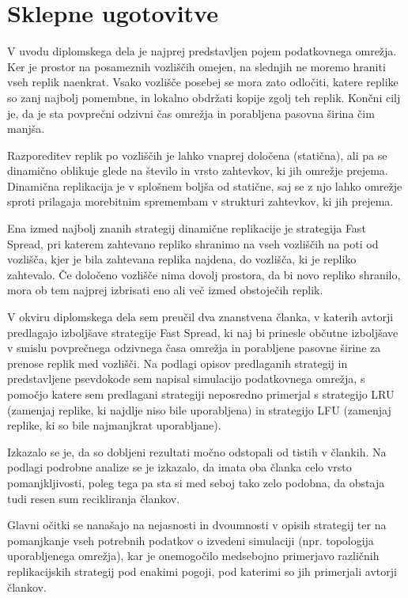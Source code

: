 \documentclass[a4paper, 12pt]{book}
\begin{document}
\chapter{Sklepne ugotovitve}

V uvodu diplomskega dela je najprej predstavljen pojem podatkovnega omre\-žja.
Ker je prostor na posameznih vozliščih omejen, na slednjih ne moremo hraniti
vseh replik naenkrat. Vsako vozlišče posebej se mora zato odločiti, katere
replike so zanj najbolj pomembne, in lokalno obdržati kopije zgolj teh replik.
Končni cilj je, da je sta povprečni odzivni čas omrežja in porabljena pasovna
širina čim manjša.

Razporeditev replik po vozliščih je lahko vnaprej določena (statična), ali
pa se dinamično oblikuje glede na število in vrsto zahtevkov, ki jih omrežje
prejema. Dinamična replikacija je v splošnem boljša od statične, saj se
z njo lahko omrežje sproti prilagaja morebitnim spremembam v strukturi
zahtevkov, ki jih prejema.

Ena izmed najbolj znanih strategij dinamične replikacije je strategija
Fast Spread, pri katerem zahtevano repliko shranimo na vseh vozliščih na
poti od vozlišča, kjer je bila zahtevana replika najdena, do vozlišča, ki
je repliko zahtevalo. Če določeno vozlišče nima dovolj prostora, da
bi novo repliko shranilo, mora ob tem najprej izbrisati eno ali več
izmed obstoječih replik.

V okviru diplomskega dela sem preučil dva znanstvena članka, v katerih avtorji
predlagajo izboljšave strategije Fast Spread, ki naj bi prinesle občutne
izboljšave v smislu povprečnega odzivnega časa omrežja in porabljene
pasovne širine za prenose replik med vozlišči. Na podlagi opisov predlaganih
strategij in predstavljene psevdokode sem napisal simulacijo podatkovnega
omrežja, s pomočjo katere sem predlagani strategiji neposredno primerjal s
strategijo LRU (zamenjaj replike, ki najdlje niso bile uporabljena) in
strategijo LFU (zamenjaj replike, ki so bile najmanjkrat uporabljane).

Izkazalo se je, da so dobljeni rezultati močno odstopali od tistih v člankih.
Na podlagi podrobne analize se je izkazalo, da imata oba članka celo vrsto
pomanjkljivosti, poleg tega pa sta si med seboj tako zelo podobna, da
obstaja tudi resen sum recikliranja člankov.

Glavni očitki se nanašajo na nejasnosti in dvoumnosti v opisih strategij
ter na pomanjkanje vseh potrebnih podatkov o izvedeni simulaciji (npr.
topologija uporabljenega omrežja), kar je onemogočilo medsebojno primerjavo
različnih replikacijskih strategij pod enakimi pogoji, pod katerimi so jih
primerjali avtorji člankov.
\end{document}
